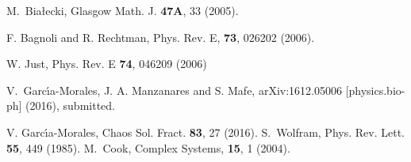 \documentclass[aps,pre,preprint,floatfix]{revtex4}
\theoremstyle{plain} \newtheorem{defi}{Definition}[section]
\theoremstyle{plain} \newtheorem{prop}{Proposition}[section]
\theoremstyle{plain} \newtheorem{theor}{Theorem}[section]
\theoremstyle{plain} \newtheorem{lemma}{Lemma}[section]
\theoremstyle{plain} \newtheorem*{corol}{Corollary}
\theoremstyle{remark} \newtheorem*{rem}{Remark}
\theoremstyle{plain} \newtheorem{exer}{Exercise}[section]
\theoremstyle{remark} \newtheorem*{ans}{Answer}
\begin{document}
\begin{thebibliography}{9}
M.~Bia\l{}ecki,
\newblock Glasgow Math. J. {\bf 47A}, 33 (2005).

F. Bagnoli and R. Rechtman, 
\newblock Phys. Rev. E, \textbf{73}, 026202 (2006).

W. Just, Phys. Rev. E {\bf 74}, 046209 (2006)

V.~Garc\'{\i}a-Morales, J. A. Manzanares and S. Mafe,  	arXiv:1612.05006 [physics.bio-ph] (2016), submitted.

 V. Garc{\'\i}a-Morales,  Chaos Sol. Fract. {\bf 83}, 27 (2016).
S.~Wolfram, Phys. Rev. Lett. {\bf 55}, 449 (1985).
M.~Cook, Complex Systems, \textbf{15}, 1 (2004).





\end{thebibliography}
\end{document}
